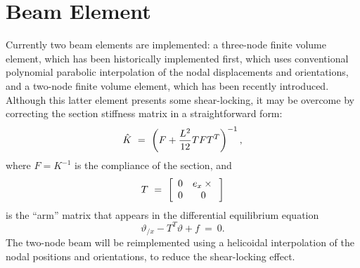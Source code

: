 \section{Beam Element}
Currently two beam elements are implemented: a three-node finite volume
element, which has been historically implemented first, which uses
conventional polynomial parabolic interpolation of the nodal displacements
and orientations, and a two-node finite volume element, which has been
recently introduced.
Although this latter element presents some shear-locking, it may be overcome
by correcting the section stiffness matrix in a straightforward form:
\begin{displaymath}
	\hat{K} \ = \ \plbr{F + \frac{L^2}{12}T F T^T}^{-1} ,
\end{displaymath}
where $F=K^{-1}$ is the compliance of the section, and
\begin{displaymath}
	T \ = \ \sqbr{\matr{cc}{
		0 & e_x \times{} \\
		0 & 0
	}}
\end{displaymath}
is the ``arm'' matrix that appears in the differential equilibrium equation
\begin{displaymath}
	\vartheta_{/x} - T^T\vartheta + f \ = \ 0 .
\end{displaymath}
The two-node beam will be reimplemented using a helicoidal interpolation
of the nodal positions and orientations, to reduce the shear-locking effect.

